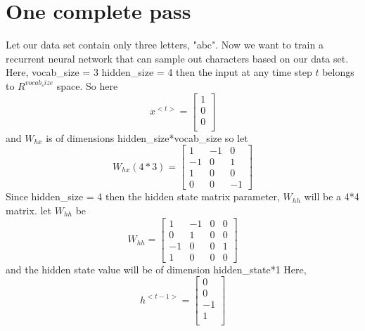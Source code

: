 \documentclass[12pt,letterpaper]{article}
\begin{document}
\section{One complete pass}
Let our data set contain only three letters, "abc".
Now we want to train a recurrent neural network that can sample out characters based on our data set.
\\

Here,
vocab\_size = 3
hidden\_size = 4
then the input at any time step $t$ belongs to $R^{vocab_size}$ space.
So here 
\[
x^{<t>} = \begin{bmatrix}
1\\
0\\
0\\
\end{bmatrix}
\]
and $W_{hx}$ is of dimensions hidden\_size*vocab\_size
so let
\[
W_{hx} (4*3) = 
\begin{bmatrix}
1 &-1& 0\\
-1& 0& 1\\
1 &0 &0\\
0 &0& -1
\end{bmatrix}
\]
Since hidden\_size = 4
then the hidden state matrix parameter, $W_{hh}$ will be a 4*4 matrix.
let $W_{hh}$ be
\[
W_{hh} = \begin{bmatrix}
1 &-1&0&0\\
0&1&0&0\\
-1&0&0&1\\
1&0&0&0
\end{bmatrix}
\]
and the hidden state value will be of dimension hidden\_state*1 Here,
\[
h^{<t-1>} = \begin{bmatrix}
0\\
0\\
-1\\
1\\
\end{bmatrix}
\]
\end{document}
